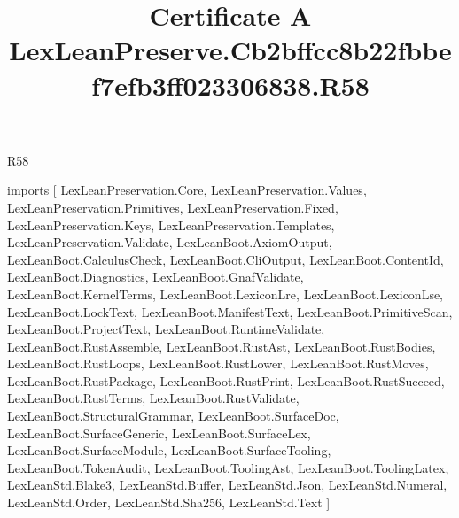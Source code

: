 \begin{lexlean}{R58}
\title{Certificate A LexLeanPreserve.Cb2bffcc8b22fbbef7efb3ff023306838.R58}
\begin{coremodule}
imports [
  LexLeanPreservation.Core,
  LexLeanPreservation.Values,
  LexLeanPreservation.Primitives,
  LexLeanPreservation.Fixed,
  LexLeanPreservation.Keys,
  LexLeanPreservation.Templates,
  LexLeanPreservation.Validate,
  LexLeanBoot.AxiomOutput,
  LexLeanBoot.CalculusCheck,
  LexLeanBoot.CliOutput,
  LexLeanBoot.ContentId,
  LexLeanBoot.Diagnostics,
  LexLeanBoot.GnafValidate,
  LexLeanBoot.KernelTerms,
  LexLeanBoot.LexiconLre,
  LexLeanBoot.LexiconLse,
  LexLeanBoot.LockText,
  LexLeanBoot.ManifestText,
  LexLeanBoot.PrimitiveScan,
  LexLeanBoot.ProjectText,
  LexLeanBoot.RuntimeValidate,
  LexLeanBoot.RustAssemble,
  LexLeanBoot.RustAst,
  LexLeanBoot.RustBodies,
  LexLeanBoot.RustLoops,
  LexLeanBoot.RustLower,
  LexLeanBoot.RustMoves,
  LexLeanBoot.RustPackage,
  LexLeanBoot.RustPrint,
  LexLeanBoot.RustSucceed,
  LexLeanBoot.RustTerms,
  LexLeanBoot.RustValidate,
  LexLeanBoot.StructuralGrammar,
  LexLeanBoot.SurfaceDoc,
  LexLeanBoot.SurfaceGeneric,
  LexLeanBoot.SurfaceLex,
  LexLeanBoot.SurfaceModule,
  LexLeanBoot.SurfaceTooling,
  LexLeanBoot.TokenAudit,
  LexLeanBoot.ToolingAst,
  LexLeanBoot.ToolingLatex,
  LexLeanStd.Blake3,
  LexLeanStd.Buffer,
  LexLeanStd.Json,
  LexLeanStd.Numeral,
  LexLeanStd.Order,
  LexLeanStd.Sha256,
  LexLeanStd.Text
]


\end{coremodule}
\end{lexlean}
